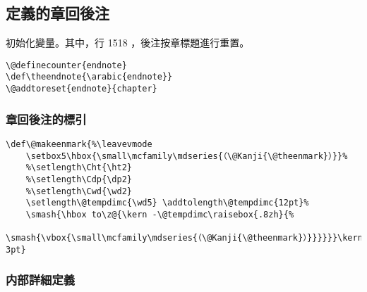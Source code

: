 \subsection{定義的章回後注}

\par%
初始化變量。其中，行 1518 ，後注按章標題進行重置。
\begin{lstlisting}[firstnumber=1516]
\@definecounter{endnote}
\def\theendnote{\arabic{endnote}}
\@addtoreset{endnote}{chapter}
\end{lstlisting}

\subsubsection{章回後注的標引}

\begin{lstlisting}[firstnumber=1522]
\def\@makeenmark{%\leavevmode
	\setbox5\hbox{\small\mcfamily\mdseries{（\@Kanji{\@theenmark}）}}%
	%\setlength\Cht{\ht2}
	%\setlength\Cdp{\dp2}
	%\setlength\Cwd{\wd2}
	\setlength\@tempdimc{\wd5} \addtolength\@tempdimc{12pt}%
	\smash{\hbox to\z@{\kern -\@tempdimc\raisebox{.8zh}{%
	\smash{\vbox{\small\mcfamily\mdseries{（\@Kanji{\@theenmark}）}}}}}}\kern-3pt}
\end{lstlisting}

\subsubsection{内部詳細定義}

